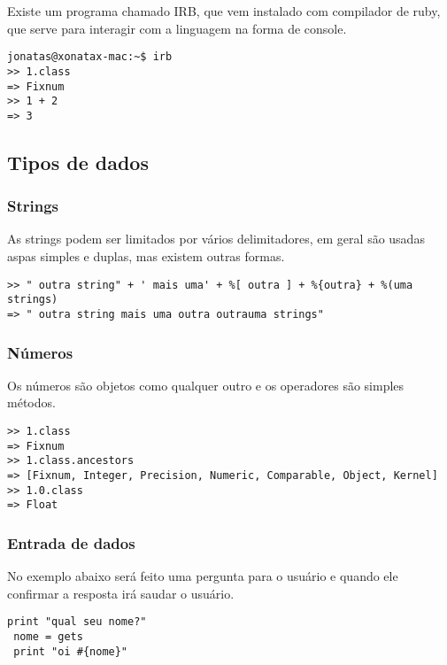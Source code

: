 \documentclass[12pt]{article}
\begin{document}
Existe um programa chamado IRB, que vem instalado com compilador de ruby, que serve para interagir com a linguagem na forma de console.

\begin{lstlisting}[caption=Usando o compilador na linha de comando]
jonatas@xonatax-mac:~$ irb
>> 1.class
=> Fixnum
>> 1 + 2
=> 3
\end{lstlisting}

\subsection { Tipos de dados }

\subsubsection { Strings }

As strings podem ser limitados por vários delimitadores, em geral são usadas aspas simples e duplas, mas existem outras formas.

\begin{lstlisting}[caption=Exemplos de uso de string]
>> " outra string" + ' mais uma' + %[ outra ] + %{outra} + %(uma strings)
=> " outra string mais uma outra outrauma strings"
\end{lstlisting}

\subsubsection { Números }

Os números são objetos como qualquer outro e os operadores são simples métodos.

\begin{lstlisting}[caption=Exemplos de uso de números ]
>> 1.class
=> Fixnum
>> 1.class.ancestors
=> [Fixnum, Integer, Precision, Numeric, Comparable, Object, Kernel]
>> 1.0.class
=> Float
\end{lstlisting}

\subsubsection { Entrada de dados }

No exemplo abaixo será feito uma pergunta para o usuário e quando ele confirmar a resposta irá saudar o usuário.

\begin{lstlisting}[caption=Exemplo de entrada de dados ]
 print "qual seu nome?"
 nome = gets
 print "oi #{nome}"
\end{lstlisting}
 
\end{document}
